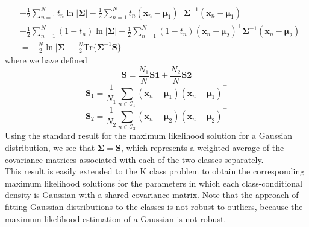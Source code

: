 \documentclass[twoside]{article}
\begin{document}
\begin{equation*}
    \begin{aligned}
        &-\frac{1}{2}\sum\limits_{n = 1}^{N}t_n\ln{|\boldsymbol{\Sigma}|} - \frac{1}{2}\sum\limits_{n = 1}^{N}t_n(\boldsymbol{x}_n - \boldsymbol{\mu}_1)^\intercal\boldsymbol{\Sigma}^{-1}(\boldsymbol{x}_n - \boldsymbol{\mu}_1)\\
        &-\frac{1}{2}\sum\limits_{n = 1}^{N}( 1 - t_n)\ln{|\boldsymbol{\Sigma}|} - \frac{1}{2}\sum\limits_{n = 1}^{N}(1 - t_n)(\boldsymbol{x}_n - \boldsymbol{\mu}_2)^\intercal\boldsymbol{\Sigma}^{-1}(\boldsymbol{x}_n - \boldsymbol{\mu}_2)\\
        &= -\frac{N}{2}\ln{|\boldsymbol{\Sigma}|} - \frac{N}{2}\text{Tr}\{\boldsymbol{\Sigma}^{-1}\textbf{S}\}
    \end{aligned}
\end{equation*}
where we have defined
\begin{equation*}
    \textbf{S} = \frac{N_1}{N}\textbf{S1} + \frac{N_2}{N}\textbf{S2}
\end{equation*}
\begin{equation*}
    \textbf{S}_1 = \frac{1}{N_1}\sum\limits_{n \in \mathcal{C}_1}(\boldsymbol{x}_n - \boldsymbol{\mu}_1)(\boldsymbol{x}_n - \boldsymbol{\mu}_1)^\intercal
\end{equation*}
\begin{equation*}
    \textbf{S}_2 = \frac{1}{N_2}\sum\limits_{n \in \mathcal{C}_2}(\boldsymbol{x}_n - \boldsymbol{\mu}_2)(\boldsymbol{x}_n - \boldsymbol{\mu}_2)^\intercal
\end{equation*}
Using the standard result for the maximum likelihood solution for a Gaussian distribution, we see that $\boldsymbol{\Sigma} = \textbf{S}$, which represents a weighted average of the covariance matrices associated with each of the two classes separately.\\
This result is easily extended to the K class problem to obtain the corresponding maximum likelihood solutions for the parameters in which each class-conditional density is Gaussian with a shared covariance matrix. Note that the approach of fitting Gaussian distributions to the classes is not robust to outliers, because the maximum likelihood estimation of a Gaussian is not robust.
\end{document}
